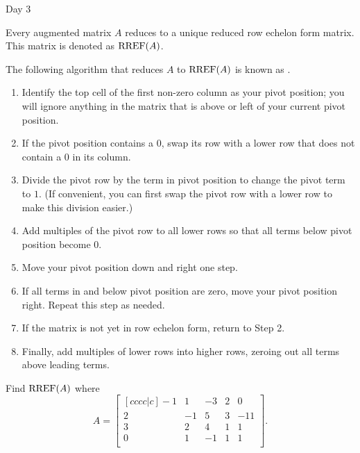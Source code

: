 
\begin{applicationActivities}{Day 3}

\begin{fact}
  Every augmented matrix \(A\) reduces to a unique reduced row echelon form
  matrix. This matrix is denoted as \(\operatorname{RREF}(A)\).
\end{fact}

\begin{definition}%
  The following algorithm that reduces \(A\) to \(\operatorname{RREF}(A)\) is known as
  .

  \begin{multicols}{2}\noindent
  \begin{enumerate}
    \item Identify
    the top cell of the first non-zero column as your pivot position;
    you will ignore anything in the matrix that is above or left of your
    current pivot position.
    \item If the pivot position contains a \(0\), swap its row with a lower
          row that does not contain a \(0\) in its column.
    \item Divide the pivot row by the term in pivot position to change the
          pivot term to \(1\). (If convenient, you can first swap the
          pivot row with a lower row to make this division easier.)
    \item Add multiples of the pivot row to all lower rows so that all terms
          below pivot position become \(0\).
    \item Move your pivot position down and right one step.
    \item If all terms in and below pivot position are zero, move your
          pivot position right. Repeat this step as needed.
    \item If the matrix is not yet in row echelon form, return to Step 2.
    \item Finally, add multiples of lower rows into higher rows, zeroing out
          all terms above leading terms.
  \end{enumerate}
  \end{multicols}
\end{definition}

\begin{activity}{15}
  Find \(\operatorname{RREF}(A)\) where
  \[A=
    \begin{bmatrix}[cccc|c]
      -1 &  1 & -3 &  2 &  0 \\
       2 & -1 &  5 &  3 & -11 \\
       3 &  2 &  4 &  1 &  1 \\
       0 &  1 & -1 &  1 &  1 \\
    \end{bmatrix}
  .\]
\end{activity}


\end{applicationActivities}
